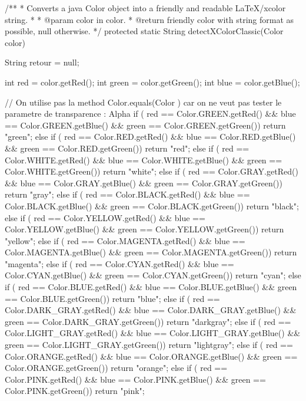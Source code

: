 \begin{code}
\begin{hide}

   /**
    * Converts a java Color object into a friendly and readable LaTeX/xcolor string.
    *
    * @param   color    in color.
    * @return           friendly color with string format as possible, null otherwise.
    */
   protected static String detectXColorClassic(Color color) {
      String retour = null;

      int red = color.getRed();
      int green = color.getGreen();
      int blue = color.getBlue();

      // On utilise pas la method Color.equals(Color ) car on ne veut pas tester le parametre de transparence : Alpha
      if (   red == Color.GREEN.getRed()
          && blue == Color.GREEN.getBlue()
          && green == Color.GREEN.getGreen())
         return "green";
      else if (   red == Color.RED.getRed()
               && blue == Color.RED.getBlue()
               && green == Color.RED.getGreen())
         return "red";
      else if (   red == Color.WHITE.getRed()
               && blue == Color.WHITE.getBlue()
               && green == Color.WHITE.getGreen())
         return "white";
      else if (   red == Color.GRAY.getRed()
               && blue == Color.GRAY.getBlue()
               && green == Color.GRAY.getGreen())
          return "gray";
      else if (   red == Color.BLACK.getRed()
               && blue == Color.BLACK.getBlue()
               && green == Color.BLACK.getGreen())
          return "black";
      else if (   red == Color.YELLOW.getRed()
               && blue == Color.YELLOW.getBlue()
               && green == Color.YELLOW.getGreen())
          return "yellow";
      else if (   red == Color.MAGENTA.getRed()
               && blue == Color.MAGENTA.getBlue()
               && green == Color.MAGENTA.getGreen())
          return "magenta";
      else if (   red == Color.CYAN.getRed()
               && blue == Color.CYAN.getBlue()
               && green == Color.CYAN.getGreen())
          return "cyan";
      else if (   red == Color.BLUE.getRed()
               && blue == Color.BLUE.getBlue()
               && green == Color.BLUE.getGreen())
          return "blue";
      else if (   red == Color.DARK_GRAY.getRed()
               && blue == Color.DARK_GRAY.getBlue()
               && green == Color.DARK_GRAY.getGreen())
          return "darkgray";
      else if (   red == Color.LIGHT_GRAY.getRed()
               && blue == Color.LIGHT_GRAY.getBlue()
               && green == Color.LIGHT_GRAY.getGreen())
          return "lightgray";
      else if (   red == Color.ORANGE.getRed()
               && blue == Color.ORANGE.getBlue()
               && green == Color.ORANGE.getGreen())
          return "orange";
      else if (   red == Color.PINK.getRed()
               && blue == Color.PINK.getBlue()
               && green == Color.PINK.getGreen())
          return "pink";


}
\end{hide}
\end{code}
